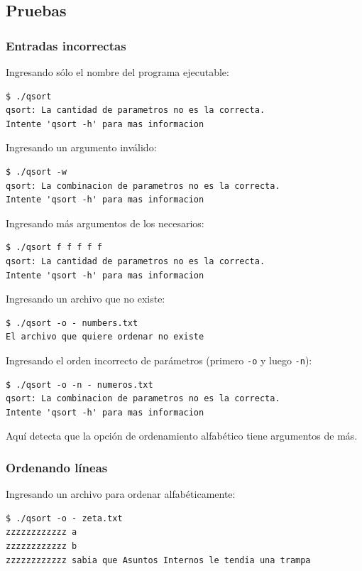 \documentclass[a4paper, 12pt]{article}
\begin{document}
	\subsection{Pruebas}
	
	\subsubsection{Entradas incorrectas}
	Ingresando sólo el nombre del programa ejecutable:
	\begin{verbatim}
$ ./qsort
qsort: La cantidad de parametros no es la correcta.
Intente 'qsort -h' para mas informacion
	\end{verbatim}
	Ingresando un argumento inválido:
	\begin{verbatim}
$ ./qsort -w
qsort: La combinacion de parametros no es la correcta.
Intente 'qsort -h' para mas informacion
	\end{verbatim}
	Ingresando más argumentos de los necesarios:
	\begin{verbatim}
$ ./qsort f f f f f
qsort: La cantidad de parametros no es la correcta.
Intente 'qsort -h' para mas informacion
	\end{verbatim}
	Ingresando un archivo que no existe:
	\begin{verbatim}
$ ./qsort -o - numbers.txt
El archivo que quiere ordenar no existe
	\end{verbatim}
	Ingresando el orden incorrecto de parámetros (primero \texttt{-o} y luego \texttt{-n}):
	\begin{verbatim}
$ ./qsort -o -n - numeros.txt
qsort: La combinacion de parametros no es la correcta.
Intente 'qsort -h' para mas informacion
	\end{verbatim}
Aquí detecta que la opción de ordenamiento alfabético tiene argumentos de más.
	
	
	
	\subsubsection{Ordenando líneas}
Ingresando un archivo para ordenar alfabéticamente:
	\begin{verbatim}
$ ./qsort -o - zeta.txt
zzzzzzzzzzzz a
zzzzzzzzzzzz b
zzzzzzzzzzzz sabia que Asuntos Internos le tendia una trampa
	\end{verbatim}
	
\end{document}

